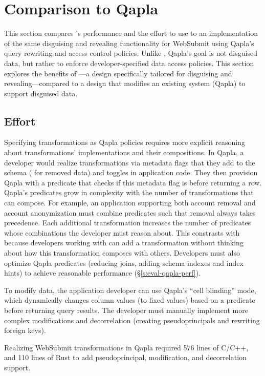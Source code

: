 \section{Comparison to Qapla}
\label{s:eval-qapla}

This section compares \sys's performance and the effort to use \sys to an
implementation of the same disguising and revealing functionality for WebSubmit
using Qapla’s query rewriting and access control policies. 
%
Unlike \sys, Qapla's goal is not disguised data, but rather to enforce
developer-specified data access policies.
%
This section explores the benefits of \sys---a design specifically tailored for
disguising and revealing---compared to a design that modifies an existing system
(\ie Qapla) to support disguised data.
%

%
\subsection{Effort}
%
Specifying \xxing transformations as Qapla policies requires more
explicit reasoning about transformations' implementations and their
compositions.
%
In Qapla, a developer would realize \xxing transformations via metadata flags
that they add to the schema (\eg {} for removed data) and toggles in
application code. They then provision Qapla with a predicate that checks if
this metadata flag is  before returning a row.
%
Qapla's predicates grow in complexity
with the number of \xxing transformations that can compose. For example, an
application supporting both account removal and account anonymization must
combine predicates such that removal always takes precedence. Each additional
transformation increases the number of predicates whose combinations the
developer must reason about.
%
This constrasts with \sys because developers working with \sys can add 
a transformation without thinking about how this transformation composes
with others.
%
Developers must also optimize Qapla predicates (\eg reducing joins, adding
schema indexes and index hints) to achieve reasonable performance
(\S\ref{s:eval-qapla-perf}).

%
To modify data, the application developer can use Qapla's ``cell blinding''
mode, which dynamically changes column values (to fixed values) based on a
predicate before returning query results.
%
The developer must manually implement more complex modifications and
decorrelation (\ie creating pseudoprincipals and rewriting foreign keys).
%

%
Realizing WebSubmit transformations in Qapla required 576 lines of C/C++, and
110 lines of Rust to add pseudoprincipal, modification, and decorrelation
support.
%

